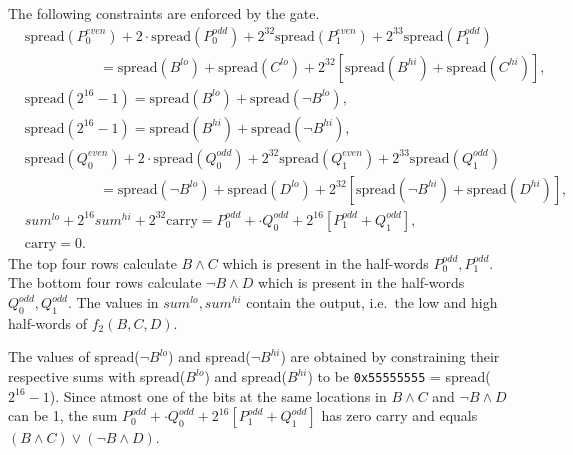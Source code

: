 \documentclass[10pt]{article}
\begin{document}
  The following constraints are enforced by the gate.
\begin{align*}
  & \text{spread}(P_0^{even}) + 2\cdot \text{spread}(P_0^{odd}) + 2^{32}\text{spread}(P_1^{even}) + 2^{33}\text{spread}(P_1^{odd})  \\
  &\ \ \ \ \ \ \ \ \ \ \ \ \ \ \ \ \ \ \ \ \ \ \ \ = \text{spread} (B^{lo}) +\text{spread} (C^{lo}) + 2^{32} \left[ \text{spread} (B^{hi}) +\text{spread} (C^{hi}) \right],\\
  & \text{spread}(2^{16}-1) = \text{spread} (B^{lo}) + \text{spread} (\lnot B^{lo}), \\
  & \text{spread}(2^{16}-1) = \text{spread} (B^{hi}) + \text{spread} (\lnot B^{hi}), \\
  & \text{spread}(Q_0^{even}) + 2\cdot \text{spread}(Q_0^{odd}) + 2^{32}\text{spread}(Q_1^{even}) + 2^{33}\text{spread}(Q_1^{odd})  \\
  &\ \ \ \ \ \ \ \ \ \ \ \ \ \ \ \ \ \ \ \ \ \ \ \ = \text{spread} (\lnot B^{lo}) +\text{spread} (D^{lo}) + 2^{32} \left[ \text{spread} (\lnot B^{hi}) +\text{spread} (D^{hi}) \right],\\
  & sum^{lo} + 2^{16} sum^{hi} + 2^{32} \text{carry} = P_0^{odd} + \cdot Q_0^{odd} + 2^{16} \left[ P_1^{odd} + Q_1^{odd} \right],\\
  & \text{carry} = 0.
\end{align*}
The top four rows calculate $B \wedge C$ which is present in the half-words $P_0^{odd}, P_1^{odd}$.
The bottom four rows calculate $\lnot B \wedge D$ which is present in the half-words $Q_0^{odd}, Q_1^{odd}$.
The values in $sum^{lo}, sum^{hi}$ contain the output, i.e.~the low and high half-words of $f_2(B,C,D)$.

The values of spread($\lnot B^{lo}$) and spread($\lnot B^{hi}$) are obtained by constraining their respective sums with spread($B^{lo}$) and spread($B^{hi}$) to be \texttt{0x55555555} = spread($2^{16}-1$). Since atmost one of the bits at the same locations in $B \wedge C$ and $\lnot B \wedge D$ can be 1, the sum  $P_0^{odd} + \cdot Q_0^{odd} + 2^{16} \left[ P_1^{odd} + Q_1^{odd} \right]$ has zero carry and equals $(B \wedge C) \vee (\lnot B \wedge D)$.
\end{document}
